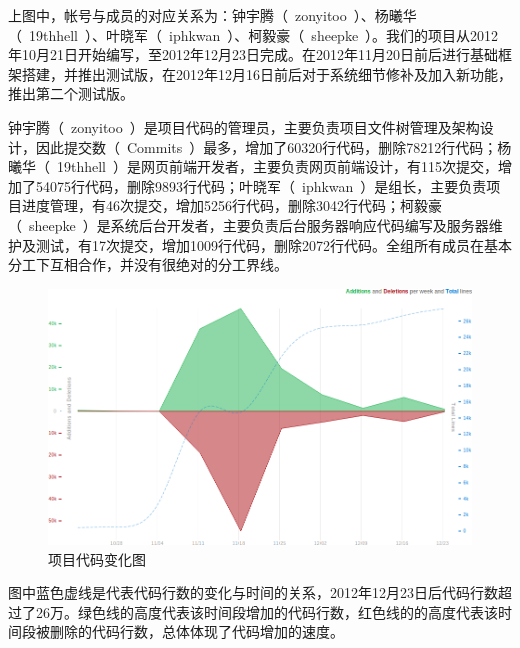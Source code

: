 上图中，帐号与成员的对应关系为：钟宇腾（~zonyitoo~）、杨曦华（~19thhell~）、叶晓军（~iphkwan~）、柯毅豪（~sheepke~）。我们的项目从2012年10月21日开始编写，至2012年12月23日完成。在2012年11月20日前后进行基础框架搭建，并推出测试版，在2012年12月16日前后对于系统细节修补及加入新功能，推出第二个测试版。

钟宇腾（~zonyitoo~）是项目代码的管理员，主要负责项目文件树管理及架构设计，因此提交数（~Commits~）最多，增加了60320行代码，删除78212行代码；杨曦华（~19thhell~）是网页前端开发者，主要负责网页前端设计，有115次提交，增加了54075行代码，删除9893行代码；叶晓军（~iphkwan~）是组长，主要负责项目进度管理，有46次提交，增加5256行代码，删除3042行代码；柯毅豪（~sheepke~）是系统后台开发者，主要负责后台服务器响应代码编写及服务器维护及测试，有17次提交，增加1009行代码，删除2072行代码。全组所有成员在基本分工下互相合作，并没有很绝对的分工界线。

\begin{figure}[H]
   \centering \includegraphics[width=\textwidth]{img/code_freq.png}
   \caption{项目代码变化图}
\end{figure}

图中蓝色虚线是代表代码行数的变化与时间的关系，2012年12月23日后代码行数超过了26万。绿色线的高度代表该时间段增加的代码行数，红色线的的高度代表该时间段被删除的代码行数，总体体现了代码增加的速度。

